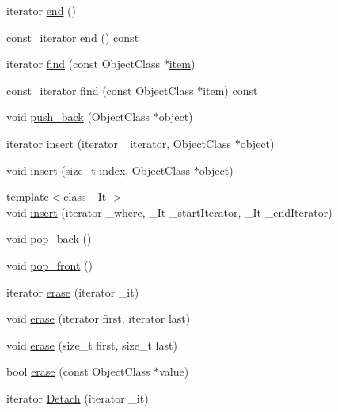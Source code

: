 \begin{DoxyCompactItemize}
\item 
iterator \hyperlink{classFUObjectContainer_afa538b19b625b12df198dd5604d49ffa}{end} ()
\item 
const\_\-iterator \hyperlink{classFUObjectContainer_af0a3be7ae01b6803ac6dd4911ec9b740}{end} () const 
\item 
iterator \hyperlink{classFUObjectContainer_a789a4b7a1032d25f725ad43a124afc79}{find} (const ObjectClass $\ast$\hyperlink{classfm_1_1pvector_af6ced3802a18342adc0b26355d1b75bf}{item})
\item 
const\_\-iterator \hyperlink{classFUObjectContainer_a7bf320e12a4a134521a5eb0d1550d1fe}{find} (const ObjectClass $\ast$\hyperlink{classfm_1_1pvector_af6ced3802a18342adc0b26355d1b75bf}{item}) const 
\item 
void \hyperlink{classFUObjectContainer_a9a1a09f62802a2e9741a64e1c360562b}{push\_\-back} (ObjectClass $\ast$object)
\item 
iterator \hyperlink{classFUObjectContainer_a98521997753d6c926a8a95f7cae44889}{insert} (iterator \_\-iterator, ObjectClass $\ast$object)
\item 
void \hyperlink{classFUObjectContainer_ac2a100c856c985e4f8873a3e5ae78bc8}{insert} (size\_\-t index, ObjectClass $\ast$object)
\item 
{\footnotesize template$<$class \_\-It $>$ }\\void \hyperlink{classFUObjectContainer_a7a80b268403f74d794a09e6b057850da}{insert} (iterator \_\-where, \_\-It \_\-startIterator, \_\-It \_\-endIterator)
\item 
void \hyperlink{classFUObjectContainer_a5ca44ff29a0b7d9a0fe570c20128e4c7}{pop\_\-back} ()
\item 
void \hyperlink{classFUObjectContainer_acbc75007166b9ff643e19c3155521798}{pop\_\-front} ()
\item 
iterator \hyperlink{classFUObjectContainer_a33e43cf985c1d89f3b6cdf686c45a89a}{erase} (iterator \_\-it)
\item 
void \hyperlink{classFUObjectContainer_a074fe8d95fdcf84aa566ef1f3b8f5a62}{erase} (iterator first, iterator last)
\item 
void \hyperlink{classFUObjectContainer_a9120fc640d75119b516988e46c14e7b1}{erase} (size\_\-t first, size\_\-t last)
\item 
bool \hyperlink{classFUObjectContainer_abd0271c9bac9e03afb4fe0ee46f46fbf}{erase} (const ObjectClass $\ast$value)
\item 
iterator \hyperlink{classFUObjectContainer_a5eb14ee7d9342da1320df89c53e0bd26}{Detach} (iterator \_\-it)

\end{DoxyCompactItemize}
